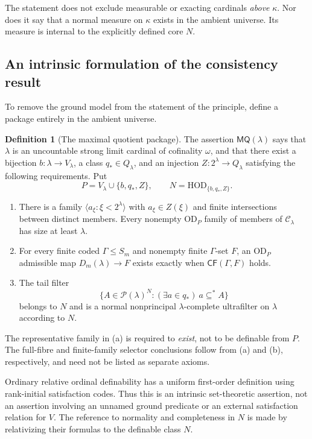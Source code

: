 \documentclass[11pt,letterpaper]{article}
\theoremstyle{definition}
\newtheorem{definition}{Definition}[section]
\numberwithin{equation}{section}
\newcommand{\OD}{\mathrm{OD}}
\newcommand{\HOD}{\mathrm{HOD}}
\newcommand{\Pow}{\mathcal P}
\newcommand{\CF}{\mathsf{CF}}
\newcommand{\MQ}{\mathsf{MQ}}
\begin{document}
The statement does not exclude measurable or exacting cardinals \emph{above} $\kappa$. Nor does it say that a normal measure on $\kappa$ exists in the ambient universe. Its measure is internal to the explicitly defined core $N$.

\subsection{An intrinsic formulation of the consistency result}

To remove the ground model from the statement of the principle, define a package entirely in the ambient universe.

\begin{definition}[The maximal quotient package]\label{def:MQ}
The assertion $\MQ(\lambda)$ says that $\lambda$ is an uncountable strong limit cardinal of cofinality $\omega$, and that there exist a bijection $b:\lambda\to V_\lambda$, a class $q_*\in Q_\lambda$, and an injection $Z:2^\lambda\to Q_\lambda$ satisfying the following requirements. Put
\[
 P=V_\lambda\cup\{b,q_*,Z\},\qquad N=\HOD_{\{b,q_*,Z\}}.
\]
\begin{enumerate}[label=\textup{(\alph*)}]
\item There is a family $\langle a_\xi:\xi<2^\lambda\rangle$ with $a_\xi\in Z(\xi)$ and finite intersections between distinct members. Every nonempty $\OD_P$ family of members of $\mathcal C_\lambda$ has size at least $\lambda$.
\item For every finite coded $\Gamma\leq S_m$ and nonempty finite $\Gamma$-set $F$, an $\OD_P$ admissible map $D_m(\lambda)\to F$ exists exactly when $\CF(\Gamma,F)$ holds.
\item The tail filter
\[
 \{A\in\Pow(\lambda)^N:(\exists a\in q_*)\ a\subseteq^* A\}
\]
belongs to $N$ and is a normal nonprincipal $\lambda$-complete ultrafilter on $\lambda$ according to $N$.
\end{enumerate}
The representative family in (a) is required to \emph{exist}, not to be definable from $P$. The full-fibre and finite-family selector conclusions follow from (a) and (b), respectively, and need not be listed as separate axioms.
\end{definition}

Ordinary relative ordinal definability has a uniform first-order definition using rank-initial satisfaction codes. Thus this is an intrinsic set-theoretic assertion, not an assertion involving an unnamed ground predicate or an external satisfaction relation for $V$. The reference to normality and completeness in $N$ is made by relativizing their formulas to the definable class $N$.
\end{document}
